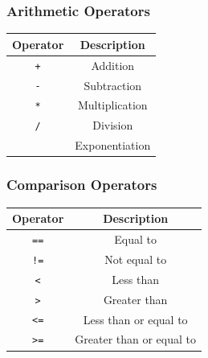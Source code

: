 \subsubsection{Arithmetic Operators}
\begin{table}[H]
    \centering
    \begin{tabular}{cc}
        \toprule
        \textbf{Operator} & \textbf{Description} \\
        \midrule
        \texttt{+} & Addition \\
        \texttt{-} & Subtraction \\
        \texttt{*} & Multiplication \\
        \texttt{/} & Division \\
        \texttt{%
        \texttt{**} & Exponentiation \\
        \bottomrule
    \end{tabular}
\end{table}

\subsubsection{Comparison Operators}
\begin{table}[H]
    \centering
    \begin{tabular}{cc}
        \toprule
        \textbf{Operator} & \textbf{Description} \\
        \midrule
        \texttt{==} & Equal to \\
        \texttt{!=} & Not equal to \\
        \texttt{<} & Less than \\
        \texttt{>} & Greater than \\
        \texttt{<=} & Less than or equal to \\
        \texttt{>=} & Greater than or equal to \\
        \bottomrule
    \end{tabular}
\end{table}

